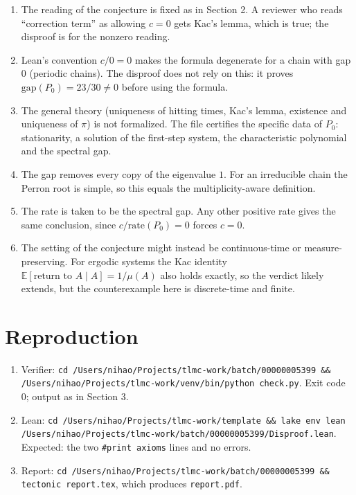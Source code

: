 \documentclass[11pt,a4paper]{article}
\begin{document}
\begin{enumerate}
\item The reading of the conjecture is fixed as in Section 2. A reviewer who reads ``correction term'' as allowing $c=0$ gets Kac's lemma, which is true; the disproof is for the nonzero reading.
\item Lean's convention $c/0=0$ makes the formula degenerate for a chain with gap $0$ (periodic chains). The disproof does not rely on this: it proves $\mathrm{gap}(P_0)=23/30\neq 0$ before using the formula.
\item The general theory (uniqueness of hitting times, Kac's lemma, existence and uniqueness of $\pi$) is not formalized. The file certifies the specific data of $P_0$: stationarity, a solution of the first-step system, the characteristic polynomial and the spectral gap.
\item The gap removes every copy of the eigenvalue $1$. For an irreducible chain the Perron root is simple, so this equals the multiplicity-aware definition.
\item The rate is taken to be the spectral gap. Any other positive rate gives the same conclusion, since $c/\mathrm{rate}(P_0)=0$ forces $c=0$.
\item The setting of the conjecture might instead be continuous-time or measure-preserving. For ergodic systems the Kac identity $\mathbb{E}[\text{return to }A\mid A]=1/\mu(A)$ also holds exactly, so the verdict likely extends, but the counterexample here is discrete-time and finite.
\end{enumerate}

\section{Reproduction}

\begin{enumerate}
\item Verifier: \texttt{cd /Users/nihao/Projects/tlmc-work/batch/00000005399 \&\& /Users/nihao/Projects/tlmc-work/venv/bin/python check.py}. Exit code 0; output as in Section 3.
\item Lean: \texttt{cd /Users/nihao/Projects/tlmc-work/template \&\& lake env lean /Users/nihao/Projects/tlmc-work/batch/00000005399/Disproof.lean}. Expected: the two \texttt{\#print axioms} lines and no errors.
\item Report: \texttt{cd /Users/nihao/Projects/tlmc-work/batch/00000005399 \&\& tectonic report.tex}, which produces \texttt{report.pdf}.
\end{enumerate}
\end{document}
